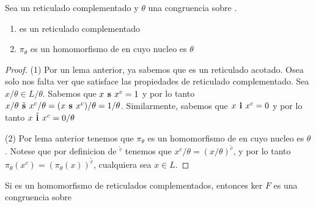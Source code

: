   \begin{lemma}
    Sea \reticulCompl un reticulado complementado y $\theta$ una congruencia sobre \reticulCompl.
    \begin{enumerate}
      \item {} es un reticulado complementado
      \item $\pi_\theta$ es un homomorfismo de \reticulCompl en  cuyo nucleo es $\theta$
    \end{enumerate}
  \end{lemma}
  \begin{proof}
    (1) Por un lema anterior, ya sabemos que  es un reticulado acotado.
    Osea solo nos falta ver que  satisface las propiedades de reticulado complementado.
    Sea $x/\theta \in L/\theta$. Sabemos que $x\textbf{ s }x^c = 1$ y por lo tanto $x/\theta\tilde{\textbf{ s }}x^c/\theta = (x\textbf{ s }x^c)/\theta = 1/\theta$.
    Similarmente, sabemos que $x\textbf{ i }x^c = 0$ y por lo tanto $x\tilde{\textbf{ i }}x^c = 0/\theta$

    (2) Por lema anterior tenemos que $\pi_\theta$ es un homomorfismo de \reticulAcot en  cuyo nucleo es $\theta$.
    Notese que por definicion de ${}^{\tilde{c}}$ tenemos que $x^c/\theta = (x/\theta)^{\tilde{c}}$, y por lo tanto $\pi_\theta(x^c) = (\pi_\theta(x))^{\tilde{c}}$,
    cualquiera sea $x \in L$.

  \end{proof}

  \begin{lemma}
    Si  es un homomorfismo de
    reticulados complementados, entonces ker $F$ es una congruencia sobre \reticulCompl
  \end{lemma}
  \noproof
